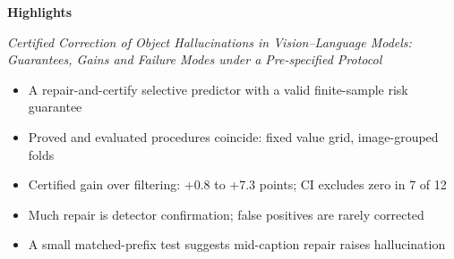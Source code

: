 \documentclass[11pt,a4paper]{article}
\begin{document}
{\large\bfseries Highlights}\par\medskip
{\itshape Certified Correction of Object Hallucinations in Vision--Language Models: Guarantees, Gains and Failure Modes under a Pre-specified Protocol}\par\bigskip
\begin{itemize}[leftmargin=1.4em,itemsep=0.6em]
\item A repair-and-certify selective predictor with a valid finite-sample risk guarantee
\item Proved and evaluated procedures coincide: fixed value grid, image-grouped folds
\item Certified gain over filtering: +0.8 to +7.3 points; CI excludes zero in 7 of 12
\item Much repair is detector confirmation; false positives are rarely corrected
\item A small matched-prefix test suggests mid-caption repair raises hallucination
\end{itemize}
\end{document}
